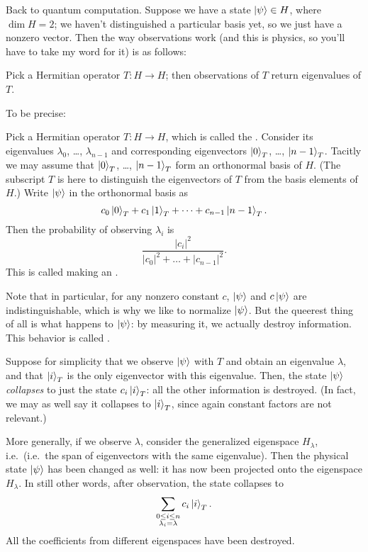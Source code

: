 \documentclass[11pt]{scrreprt}
\begin{document}
Back to quantum computation.
Suppose we have a state $\ket\psi \in H$, where $\dim H = 2$;
we haven't distinguished a particular basis yet,
so we just have a nonzero vector.
Then the way observations work (and this is physics, so you'll have to
take my word for it) is as follows:
\begin{moral}
	Pick a Hermitian operator $T : H \to H$;
	then observations of $T$ return eigenvalues of $T$.
\end{moral}
To be precise:
\begin{itemize}
	\ii Pick a Hermitian operator $T : H \to H$,
	which is called the .
	\ii Consider its eigenvalues $\lambda_0$, \dots, $\lambda_{n-1}$
	and corresponding eigenvectors $\ket{0}_T$, \dots, $\ket{n-1}_T$.
	Tacitly we may assume that $\ket{0}_T$, \dots, $\ket{n-1}_T$ form
	an orthonormal basis of $H$.
	(The subscript $T$ is here to distinguish the eigenvectors of $T$
	from the basis elements of $H$.)
	\ii Write $\ket\psi$ in the orthonormal basis as
	\[ c_0\ket0_T + c_1\ket1_T + \dots + c_{n-1}\ket{n-1}_T. \]
	\ii Then the probability of observing $\lambda_i$ is
	\[ \frac{|c_i|^2}{|c_0|^2 + \dots + |c_{n-1}|^2}. \]
	This is called making an .
\end{itemize}
Note that in particular, for any nonzero constant $c$,
$\ket\psi$ and $c\ket\psi$ are indistinguishable,
which is why we like to normalize $\ket\psi$.
But the queerest thing of all is what happens to $\ket\psi$:
by measuring it, we actually destroy information.
This behavior is called .
\begin{itemize}
	\ii Suppose for simplicity that we observe $\ket\psi$
	with $T$ and obtain an eigenvalue $\lambda$,
	and that $\ket{i}_T$ is the only eigenvector with this eigenvalue.
	Then, the state $\ket\psi$ \emph{collapses} to just the state
	$c_i \ket{i}_T$: all the other information is destroyed.
	(In fact, we may as well say it collapses to $\ket{i}_T$,
	since again constant factors are not relevant.)

	\ii	More generally, if we observe $\lambda$,
	consider the generalized eigenspace $H_\lambda$, i.e.\
	(i.e.\ the span of eigenvectors with the same eigenvalue).
	Then the physical state $\ket\psi$ has been changed as well:
	it has now been projected onto the eigenspace $H_\lambda$.
	In still other words, after observation, the state collapses to
	\[
		\sum_{\substack{0 \le i \le n \\ \substack{\lambda_i = \lambda}}}
		c_i \ket{i}_T.
	\]
	All the coefficients from different eigenspaces have been destroyed.
\end{itemize}
\end{document}
